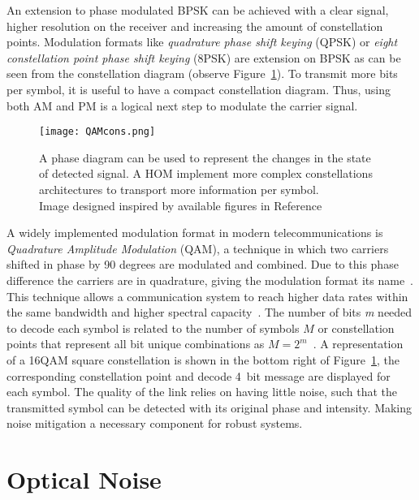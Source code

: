   An extension to phase modulated BPSK can be achieved with a clear signal, higher resolution on the receiver and increasing the amount of constellation points. Modulation formats like \textit{quadrature phase shift keying} (QPSK) or \textit{eight constellation point phase shift keying} (8PSK) are extension on BPSK as can be seen from the constellation diagram (observe Figure~\ref{fig:QAMcons}). To transmit more bits per symbol, it is useful to have a compact constellation diagram. Thus, using both AM and PM is a logical next step to modulate the carrier signal.
 
 \begin{figure}[h]
\centering
\texttt{[image: QAMcons.png]}
\caption{A phase diagram can be used to represent the changes in the state of detected signal. A HOM  implement more complex constellations architectures to transport more information per symbol.\\ {\scriptsize Image designed inspired by available figures in Reference~\cite{khan2019optical}}     }
\label{fig:QAMcons}
\end{figure}

A widely implemented modulation format in modern telecommunications is \textit{Quadrature Amplitude Modulation} (QAM), a technique in which two carriers shifted in phase by 90 degrees are modulated and combined. Due to this phase difference the carriers are in quadrature, giving the modulation format its name~\cite{benedetto1999principles}. This technique allows a communication system to reach higher data rates within the same bandwidth and higher spectral capacity~\cite{webb1994modern}. The number of bits \emph{m} needed to decode each symbol  is related to the number of symbols $M$ or constellation points that represent all bit unique combinations as $M=2^{m}$~\cite{paik1994mode}.  A representation of a 16QAM square constellation is shown in the bottom right of Figure~\ref{fig:QAMcons}, the corresponding constellation point and decode 4~bit message are displayed for each symbol. The quality of the link relies on having little noise, such that the transmitted symbol can be detected with its original phase and intensity. Making noise mitigation a necessary component for robust systems. 
 
 
  
 \section{Optical Noise}
  
